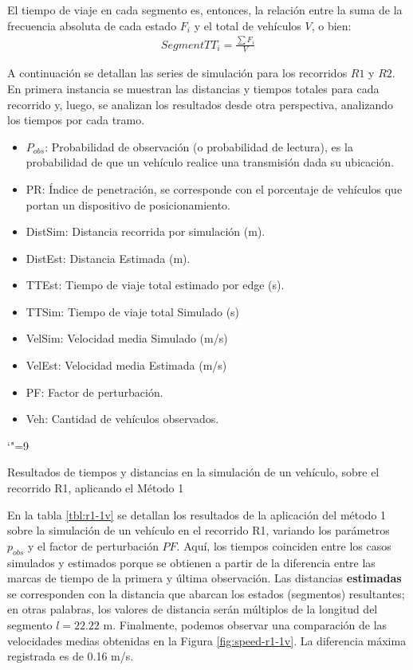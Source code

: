 El tiempo de viaje en cada segmento es, entonces, la relación entre la suma de la frecuencia absoluta de cada estado $F_i$ y el total de vehículos $V$, o bien:
\begin{align}
SegmentTT_i = \frac{\sum F_i}{V}
\end{align}

A continuación se detallan las series de simulación para los recorridos $R1$ y $R2$. En primera instancia se muestran las distancias y tiempos totales para cada recorrido y, luego, se analizan los resultados desde otra perspectiva, analizando los tiempos por cada tramo.

\begin{itemize}
\item $P_{obs}$: Probabilidad de observación (o probabilidad de lectura), es la probabilidad de que un vehículo realice una transmisión dada su ubicación.
\item PR: Índice de penetración, se corresponde con el porcentaje de vehículos que portan un dispositivo de posicionamiento.
\item DistSim: Distancia recorrida por simulación (m).
\item DistEst: Distancia Estimada (m).
\item TTEst: Tiempo de viaje total estimado por edge (s).
\item TTSim: Tiempo de viaje total Simulado (s)
\item VelSim: Velocidad media Simulado (m/s)
\item VelEst: Velocidad media Estimada (m/s)
\item PF: Factor de perturbación.
\item Veh: Cantidad de vehículos observados.
\end{itemize}

\begin{table}
\centering
\begingroup\catcode`"=9
 \captionsetup{width=0.8\textwidth}
    \caption{Resultados de tiempos y distancias en la simulación de un vehículo, sobre el recorrido R1, aplicando el Método 1}
    \label{tbl:r1-1v}
\endgroup
\end{table}

En la tabla \ref{tbl:r1-1v} se detallan los resultados de la aplicación del método 1 sobre la simulación de un vehículo en el recorrido R1, variando los parámetros $p_{obs}$ y el factor de perturbación $PF$. Aquí, los tiempos coinciden entre los casos simulados y estimados porque se obtienen a partir de la diferencia entre las marcas de tiempo de la primera y última observación. Las distancias \textbf{estimadas} se corresponden con la distancia que abarcan los estados (segmentos) resultantes; en otras palabras, los valores de distancia serán múltiplos de la longitud del segmento $l = 22.22$ m. Finalmente, podemos observar una comparación de las velocidades medias obtenidas en la Figura \ref{fig:speed-r1-1v}. La diferencia máxima registrada es de 0.16 m/s.

